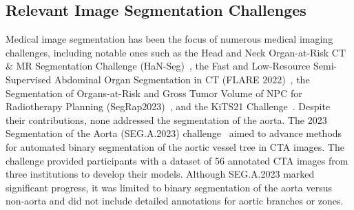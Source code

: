 \subsection{Relevant Image Segmentation Challenges}
\label{sect:aorta-related-challenges}
Medical image segmentation has been the focus of numerous medical imaging challenges, including notable ones such as the Head and Neck Organ-at-Risk CT \& MR Segmentation Challenge (HaN-Seg)~\citep{podobnik2024han}, the Fast and Low-Resource Semi-Supervised Abdominal Organ Segmentation in CT (FLARE 2022)~\citep{flare2022fast}, the Segmentation of Organs-at-Risk and Gross Tumor Volume of NPC for Radiotherapy Planning (SegRap2023)~\citep{luo2023segrap2023}, and the KiTS21 Challenge~\citep{heller2023kits21}. Despite their contributions, none addressed the segmentation of the aorta. The 2023 Segmentation of the Aorta (SEG.A.2023) challenge~\citep{pepe2024segmentation} aimed to advance methods for automated binary segmentation of the aortic vessel tree in CTA images. The challenge provided participants with a dataset of 56 annotated CTA images from three institutions to develop their models. Although SEG.A.2023 marked significant progress, it was limited to binary segmentation of the aorta versus non-aorta and did not include detailed annotations for aortic branches or zones.
